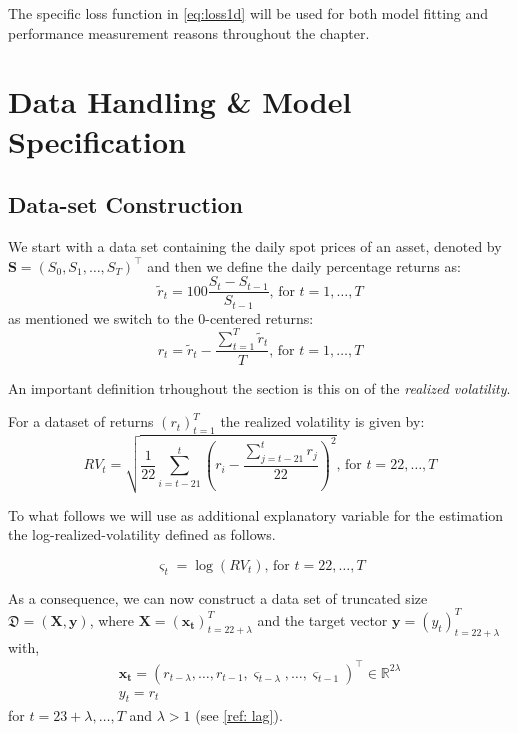 \documentclass[a4paper, oneside]{discothesis}
\begin{document}
 \begin{mdframed}\begin{remark}
The specific loss function in \ref{eq:loss1d} will be used for both model fitting and performance measurement reasons throughout the chapter. 
\end{remark}\end{mdframed}       
\section{Data Handling \& Model Specification}\label{1d_meth}
\subsection{Data-set Construction}\label{dataContr}
We start with a data set containing the daily spot prices of an asset, denoted by $\mathbf{S} = (S_0, S_1, \dots, S_T)^\intercal$ and then we define the daily percentage returns as:
\begin{equation}
    \tilde{r}_{t} = 100\frac{S_{t}-S_{t-1}}{S_{t-1}} \text{,  for } t = 1, \dots, T 
\end{equation}
as mentioned we switch to the 0-centered returns:
\begin{equation}
    r_t = \tilde{r}_t - \frac{\sum_{t = 1}^{T}\tilde{r}_t}{T} \text{,  for } t = 1, \dots, T 
\end{equation}

An important definition trhoughout the section is this on of the \textit{realized volatility}.

\begin{definition}
For a dataset of returns $(r_t)_{t = 1}^T$ the realized volatility is given by:
\begin{equation}
    RV_t = \sqrt{\frac{1}{22}\sum_{i = t-21}^{t} \left(r_i - \frac{\sum_{j=t-21}^{t} r_j}{22}\right)^2}\text{,  for } t = 22, \dots, T 
\end{equation}
\end{definition}

To what follows we will use as additional explanatory variable for the estimation the log-realized-volatility defined as follows. 

\begin{equation}\label{eq:rv}
    \varsigma_t = \log\left(RV_t\right)\text{,  for } t = 22, \dots, T 
\end{equation}

As a consequence, we can now construct a data set of truncated size $\mathfrak{D} = \left(\mathbf{X}, \mathbf{y}\right)$, where $\mathbf{X} = (\mathbf{x_t})_{t=22+\lambda}^T$ and the target vector $\mathbf{y} = (y_t)_{t = 22+\lambda}^T$ with, 
\begin{gather}\label{data_shape}
    \mathbf{x_t} = (r_{t-\lambda}, \dots, r_{t-1}, \varsigma_{t-\lambda},\dots, \varsigma_{t-1})^\intercal\in\mathbb{R}^{2\lambda}\\
    y_t = r_t
\end{gather}
 for $ t = 23+\lambda, \dots, T$ and $\lambda>1$ (see \ref{ref: lag}).
 
\end{document}
